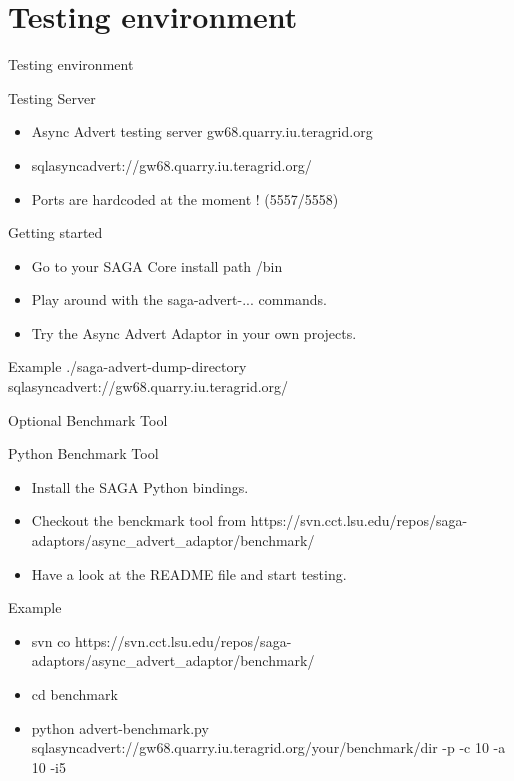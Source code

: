 \documentclass{beamer}
\begin{document}
  \section{Testing environment}
    \begin{frame}{Testing environment}
      \begin{block}{Testing Server}
        \begin{itemize}
          \item Async Advert testing server gw68.quarry.iu.teragrid.org
          \item sqlasyncadvert://gw68.quarry.iu.teragrid.org/
          \item Ports are hardcoded at the moment ! (5557/5558)
          \end{itemize}
      \end{block}
      
      \begin{block}{Getting started}
        \begin{itemize}
          \item Go to your SAGA Core install path /bin
          \item Play around with the saga-advert-... commands.
          \item Try the Async Advert Adaptor in your own projects.
          \end{itemize}
      \end{block}
    
      \begin{exampleblock}{Example}
        ./saga-advert-dump-directory sqlasyncadvert://gw68.quarry.iu.teragrid.org/
      \end{exampleblock}
    \end{frame}
    
    \begin{frame}{Optional Benchmark Tool}
      \begin{block}{Python Benchmark Tool}
        \begin{itemize}
          \item Install the SAGA Python bindings.
          \item Checkout the benckmark tool from https://svn.cct.lsu.edu/repos/saga-adaptors/async\_advert\_adaptor/benchmark/
          \item Have a look at the README file and start testing.
          \end{itemize}
      \end{block}
      
      \begin{exampleblock}{Example}
        \begin{itemize}
          \item svn co https://svn.cct.lsu.edu/repos/saga-adaptors/async\_advert\_adaptor/benchmark/
          \item cd benchmark
          \item python advert-benchmark.py sqlasyncadvert://gw68.quarry.iu.teragrid.org/your/benchmark/dir -p -c 10 -a 10 -i5
          \end{itemize}
      \end{exampleblock}
    
    \end{frame}
    
\end{document}
